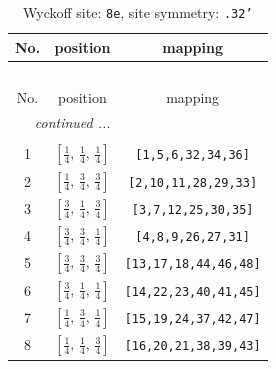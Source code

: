 \documentclass[fleqn,8pt]{jsarticle}
\begin{document}
\begin{longtable}{ccc}
\caption{Wyckoff site: {\tt 8e}, site symmetry: {\tt .32'}}
 \\
 \hline \hline
No. & position & mapping \\ \hline \endfirsthead

\multicolumn{2}{l}{\tablename\ \thetable{}} \\
 \hline \hline
No. & position & mapping \\ \hline \endhead

 \hline \hline
\multicolumn{2}{r}{\footnotesize\it continued ...} \\ \endfoot

 \hline \hline
\multicolumn{2}{r}{} \\ \endlastfoot

1 & $\left[ \frac{1}{4},\, \frac{1}{4},\, \frac{1}{4} \right]$ & {\tt [1,5,6,32,34,36]} \\ \hline
2 & $\left[ \frac{1}{4},\, \frac{3}{4},\, \frac{3}{4} \right]$ & {\tt [2,10,11,28,29,33]} \\ \hline
3 & $\left[ \frac{3}{4},\, \frac{1}{4},\, \frac{3}{4} \right]$ & {\tt [3,7,12,25,30,35]} \\ \hline
4 & $\left[ \frac{3}{4},\, \frac{3}{4},\, \frac{1}{4} \right]$ & {\tt [4,8,9,26,27,31]} \\ \hline
5 & $\left[ \frac{3}{4},\, \frac{3}{4},\, \frac{3}{4} \right]$ & {\tt [13,17,18,44,46,48]} \\ \hline
6 & $\left[ \frac{3}{4},\, \frac{1}{4},\, \frac{1}{4} \right]$ & {\tt [14,22,23,40,41,45]} \\ \hline
7 & $\left[ \frac{1}{4},\, \frac{3}{4},\, \frac{1}{4} \right]$ & {\tt [15,19,24,37,42,47]} \\ \hline
8 & $\left[ \frac{1}{4},\, \frac{1}{4},\, \frac{3}{4} \right]$ & {\tt [16,20,21,38,39,43]} \\
\end{longtable}
\renewcommand{\arraystretch}{1.2}
\end{document}
